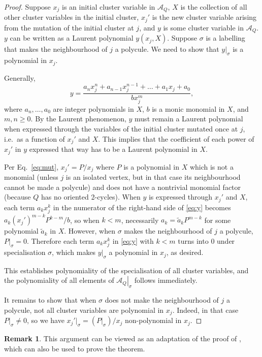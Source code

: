 \documentclass[12pt]{article}
\theoremstyle{definition}
\newtheorem{remark}{Remark}
\newcommand{\sA}{\left.\mathcal{A}_Q\right|_\sigma}
\begin{document}
\begin{proof}
Suppose $x_j$ is an initial cluster variable in $\mathcal{A}_Q$, $X$ is the collection of all other cluster variables in the initial cluster, $x_j'$ is the new cluster variable arising from the mutation of the initial cluster at $j$, and $y$ is some cluster variable in $\mathcal{A}_Q$. $y$ can be written as a Laurent polynomial $y(x_j,X)$. Suppose $\sigma$ is a labelling that makes the neighbourhood of $j$ a polycule. We need to show that $y|_\sigma$ is a polynomial in $x_j$.

Generally,
\begin{equation}
\label{eq:y}
y = \frac{a_nx_j^n + a_{n-1}x_j^{n-1}+\ldots+a_1x_j+a_0}{bx_j^m},
\end{equation}
where $a_n,\ldots,a_0$ are integer polynomials in $X$, $b$ is a monic monomial in $X$, and $m,n\geqslant0$. By the Laurent phenomenon, $y$ must remain a Laurent polynomial when expressed through the variables of the initial cluster mutated once at $j$, i.e.\ as a function of $x_j'$ and $X$. This implies that the coefficient of each power of $x_j'$ in $y$ expressed that way has to be a Laurent polynomial in $X$.

Per Eq.~\eqref{eq:mut}, $x_j'=P/x_j$ where $P$ is a polynomial in $X$ which is not a monomial (unless $j$ is an isolated vertex, but in that case its neighbourhood cannot be made a polycule) and does not have a nontrivial monomial factor (because $Q$ has no oriented 2-cycles). When $y$ is expressed through $x_j'$ and $X$, each term $a_kx_j^k$ in the numerator of the right-hand side of \eqref{eq:y} becomes $a_k(x_j')^{m-k}P^{k-m}/b$, so when $k<m$, necessarily $a_k = \tilde{a}_kP^{m-k}$ for some polynomial $\tilde{a}_k$ in $X$. However, when $\sigma$ makes the neighbourhood of $j$ a polycule, $P|_\sigma=0$. Therefore each term $a_kx_j^k$ in \eqref{eq:y} with $k<m$ turns into $0$ under specialisation $\sigma$, which makes $y|_\sigma$ a polynomial in $x_j$, as desired.

This establishes polynomiality of the specialisation of all cluster variables, and the polynomiality of all elements of $\sA$ follows immediately.

It remains to show that when $\sigma$ does not make the neighbourhood of $j$ a polycule, not all cluster variables are polynomial in $x_j$. Indeed, in that case $P|_\sigma\ne0$, so we have $x_j'|_\sigma=\left(P|_\sigma\right)/x_j$ non-polynomial in $x_j$.
\end{proof}
\begin{remark}
This argument can be viewed as an adaptation of the proof of \cite[Lemma 4.1]{CA3}, which can also be used to prove the theorem.
\end{remark}
\end{document}
